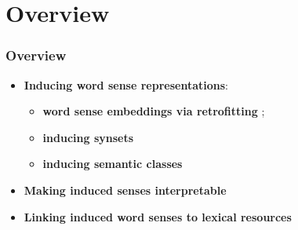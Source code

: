 
\section{Overview}

\begin{frame}
  \frametitle{Overview}

  \begin{itemize}
		\item \alert{\textbf{Inducing word sense representations}}:
		\begin{itemize}
		\item \textbf{word sense embeddings via retrofitting} \cite{pelevina-EtAl:2016:RepL4NLP,remus:2018};
		\item \textbf{inducing synsets}~\cite{ustalov-panchenko-biemann:2017:Long,ustalov2017fighting,madoc43362}
		\item \textbf{inducing semantic classes} \cite{panchenko:2018:SemanticClasses} 
		\end{itemize}
	
	
	
	\pause 
	\vspace{1em}
	\item \alert{\textbf{Making induced senses interpretable}} \cite{panchenko-EtAl:2017:EMNLP2017Demos,panchenko-EtAl:2017:EACLlong}
	
	\pause
	\vspace{1em}
	\item \alert{\textbf{Linking induced word senses to lexical resources}}~\cite{panchenko2016best,faralli2016linked,panchenko-EtAl:2017:SENSE2017,biemann2018framework}	
			
\end{itemize}
	
\end{frame}
